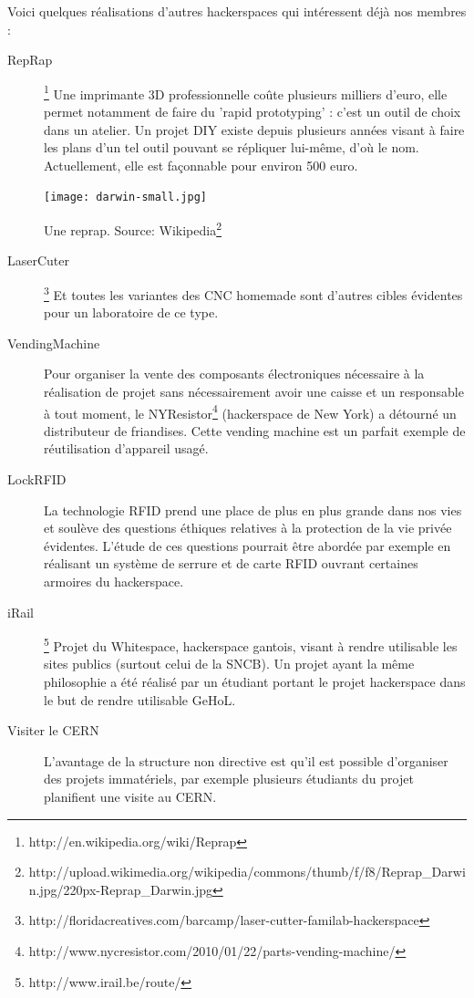 \documentclass{article}
\begin{document}
Voici quelques réalisations d'autres hackerspaces qui intéressent déjà nos membres :
\begin{description}
\item[RepRap]\footnote{http://en.wikipedia.org/wiki/Reprap} Une imprimante 3D professionnelle coûte plusieurs milliers d'euro, elle permet notamment de faire du 'rapid prototyping' : c'est un outil de choix dans un atelier. Un projet DIY existe depuis plusieurs années visant à faire les plans d'un tel outil pouvant se répliquer lui-même, d'où le nom. Actuellement, elle est façonnable pour environ 500 euro.

\begin{center}
\texttt{[image: darwin-small.jpg]}

Une reprap. Source: Wikipedia\footnote{http://upload.wikimedia.org/wikipedia/commons/thumb/f/f8/Reprap\_Darwin.jpg/220px-Reprap\_Darwin.jpg}
\end{center}

\item[LaserCuter]\footnote{http://floridacreatives.com/barcamp/laser-cutter-familab-hackerspace} Et toutes les variantes des CNC homemade sont d'autres cibles évidentes pour un laboratoire de ce type.
\item[VendingMachine] Pour organiser la vente des composants électroniques nécessaire à la réalisation de projet sans nécessairement avoir une caisse et un responsable à tout moment, le NYResistor\footnote{http://www.nycresistor.com/2010/01/22/parts-vending-machine/} (hackerspace de New York) a détourné un distributeur de friandises. Cette vending machine est un parfait exemple de réutilisation d'appareil usagé.
\item[LockRFID] La technologie RFID prend une place de plus en plus grande dans nos vies et soulève des questions éthiques relatives à la protection de la vie privée évidentes. L'étude de ces questions pourrait être abordée par exemple en réalisant un système de serrure et de carte RFID ouvrant certaines armoires du hackerspace.
\item[iRail]\footnote{http://www.irail.be/route/} Projet du Whitespace, hackerspace gantois, visant à rendre utilisable les sites publics (surtout celui de la SNCB). Un projet ayant la même philosophie a été réalisé par un étudiant portant le projet hackerspace dans le but de rendre utilisable GeHoL.
\item[Visiter le CERN] L'avantage de la structure non directive est qu'il est possible d'organiser des projets immatériels, par exemple plusieurs étudiants du projet planifient une visite au CERN.
\end{description}
\end{document}
